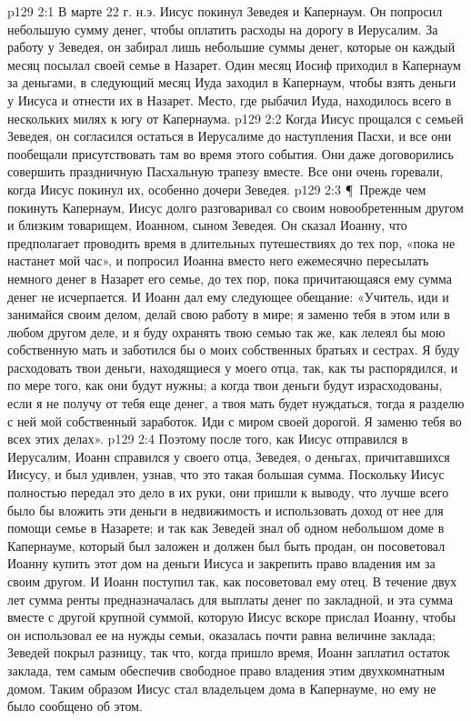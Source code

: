 \vs p129 2:1 В марте 22 г. н.э. Иисус покинул Зеведея и Капернаум. Он попросил небольшую сумму денег, чтобы оплатить расходы на дорогу в Иерусалим. За работу у Зеведея, он забирал лишь небольшие суммы денег, которые он каждый месяц посылал своей семье в Назарет. Один месяц Иосиф приходил в Капернаум за деньгами, в следующий месяц Иуда заходил в Капернаум, чтобы взять деньги у Иисуса и отнести их в Назарет. Место, где рыбачил Иуда, находилось всего в нескольких милях к югу от Капернаума.
\vs p129 2:2 Когда Иисус прощался с семьей Зеведея, он согласился остаться в Иерусалиме до наступления Пасхи, и все они пообещали присутствовать там во время этого события. Они даже договорились совершить праздничную Пасхальную трапезу вместе. Все они очень горевали, когда Иисус покинул их, особенно дочери Зеведея.
\vs p129 2:3 \P\ Прежде чем покинуть Капернаум, Иисус долго разговаривал со своим новообретенным другом и близким товарищем, Иоанном, сыном Зеведея. Он сказал Иоанну, что предполагает проводить время в длительных путешествиях до тех пор, «пока не настанет мой час», и попросил Иоанна вместо него ежемесячно пересылать немного денег в Назарет его семье, до тех пор, пока причитающаяся ему сумма денег не исчерпается. И Иоанн дал ему следующее обещание: «Учитель, иди и занимайся своим делом, делай свою работу в мире; я заменю тебя в этом или в любом другом деле, и я буду охранять твою семью так же, как лелеял бы мою собственную мать и заботился бы о моих собственных братьях и сестрах. Я буду расходовать твои деньги, находящиеся у моего отца, так, как ты распорядился, и по мере того, как они будут нужны; а когда твои деньги будут израсходованы, если я не получу от тебя еще денег, а твоя мать будет нуждаться, тогда я разделю с ней мой собственный заработок. Иди с миром своей дорогой. Я заменю тебя во всех этих делах».
\vs p129 2:4 Поэтому после того, как Иисус отправился в Иерусалим, Иоанн справился у своего отца, Зеведея, о деньгах, причитавшихся Иисусу, и был удивлен, узнав, что это такая большая сумма. Поскольку Иисус полностью передал это дело в их руки, они пришли к выводу, что лучше всего было бы вложить эти деньги в недвижимость и использовать доход от нее для помощи семье в Назарете; и так как Зеведей знал об одном небольшом доме в Капернауме, который был заложен и должен был быть продан, он посоветовал Иоанну купить этот дом на деньги Иисуса и закрепить право владения им за своим другом. И Иоанн поступил так, как посоветовал ему отец. В течение двух лет сумма ренты предназначалась для выплаты денег по закладной, и эта сумма вместе с другой крупной суммой, которую Иисус вскоре прислал Иоанну, чтобы он использовал ее на нужды семьи, оказалась почти равна величине заклада; Зеведей покрыл разницу, так что, когда пришло время, Иоанн заплатил остаток заклада, тем самым обеспечив свободное право владения этим двухкомнатным домом. Таким образом Иисус стал владельцем дома в Капернауме, но ему не было сообщено об этом.
